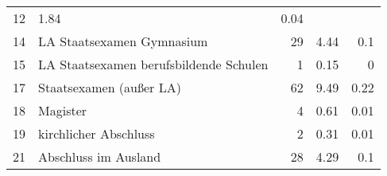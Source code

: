 \begin{longtable}{lXrrr}
       \num{12} &
       \num[round-mode=places,round-precision=2]{1,84} &
         \num[round-mode=places,round-precision=2]{0,04} \\

     14 &
     \multicolumn{1}{X}{ LA Staatsexamen Gymnasium   } &


       \num{29} &
       \num[round-mode=places,round-precision=2]{4,44} &
         \num[round-mode=places,round-precision=2]{0,1} \\

     15 &
     \multicolumn{1}{X}{ LA Staatsexamen berufsbildende Schulen   } &


       \num{1} &
       \num[round-mode=places,round-precision=2]{0,15} &
         \num[round-mode=places,round-precision=2]{0} \\

     17 &
     \multicolumn{1}{X}{ Staatsexamen (außer LA)   } &


       \num{62} &
       \num[round-mode=places,round-precision=2]{9,49} &
         \num[round-mode=places,round-precision=2]{0,22} \\

     18 &
     \multicolumn{1}{X}{ Magister   } &


       \num{4} &
       \num[round-mode=places,round-precision=2]{0,61} &
         \num[round-mode=places,round-precision=2]{0,01} \\

     19 &
     \multicolumn{1}{X}{ kirchlicher Abschluss   } &


       \num{2} &
       \num[round-mode=places,round-precision=2]{0,31} &
         \num[round-mode=places,round-precision=2]{0,01} \\

     21 &
     \multicolumn{1}{X}{ Abschluss im Ausland   } &


       \num{28} &
       \num[round-mode=places,round-precision=2]{4,29} &
         \num[round-mode=places,round-precision=2]{0,1} \\


\end{longtable}

